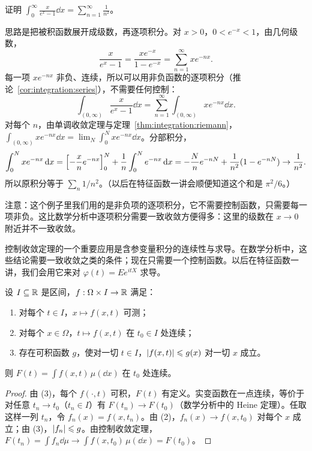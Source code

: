 \begin{workedexample}\label{we:integration:zeta2}
证明 $\displaystyle\int_0^\infty\frac x{e^x-1}\dd x=\sum_{n=1}^\infty\frac1{n^2}$。
\end{workedexample}
\begin{solution}
思路是把被积函数展开成级数，再逐项积分。对 $x>0$，$0<e^{-x}<1$，由几何级数，
\[
\frac x{e^x-1}=\frac{xe^{-x}}{1-e^{-x}}=\sum_{n=1}^\infty xe^{-nx}.
\]
每一项 $xe^{-nx}$ 非负、连续，所以可以用非负函数的逐项积分（推论~\ref{cor:integration:series}），不需要任何控制：
\[
\int_{(0,\infty)}\frac x{e^x-1}\dd x=\sum_{n=1}^\infty\int_{(0,\infty)}xe^{-nx}\dd x .
\]
对每个 $n$，由单调收敛定理与定理~\ref{thm:integration:riemann}，$\int_{(0,\infty)}xe^{-nx}\dd x=\lim_N\int_0^Nxe^{-nx}\dd x$。分部积分，
\[
\int_0^Nxe^{-nx}\,\mathrm{d} x=\Bigl[-\frac{x}{n}e^{-nx}\Bigr]_0^N+\frac1n\int_0^Ne^{-nx}\,\mathrm{d} x=-\frac Nne^{-nN}+\frac1{n^2}(1-e^{-nN})\to\frac1{n^2}.
\]
所以原积分等于 $\sum_n1/n^2$。（以后在特征函数一讲会顺便知道这个和是 $\pi^2/6$。）

注意：这个例子里我们用的是非负项的逐项积分，它不需要控制函数，只需要每一项非负。这比数学分析中逐项积分需要一致收敛方便得多：这里的级数在 $x\to0$ 附近并不一致收敛。
\end{solution}


控制收敛定理的一个重要应用是含参变量积分的连续性与求导。在数学分析中，这些结论需要一致收敛之类的条件；现在只需要一个控制函数。以后在特征函数一讲，我们会用它来对 $\varphi(t)=Ee^{itX}$ 求导。

\begin{theorem}[含参变量积分的连续性]\label{thm:integration:parameter-continuity}
设 $I\subseteq\mathbb{R}$ 是区间，$f:\Omega\times I\to\mathbb{R}$ 满足：
\begin{enumerate}
\item 对每个 $t\in I$，$x\mapsto f(x,t)$ 可测；
\item 对每个 $x\in\Omega$，$t\mapsto f(x,t)$ 在 $t_0\in I$ 处连续；
\item 存在可积函数 $g$，使对一切 $t\in I$，$\lvert f(x,t)\rvert\leqslant g(x)$ 对一切 $x$ 成立。
\end{enumerate}
则 $F(t)=\int f(x,t)\,\mu(\dd x)$ 在 $t_0$ 处连续。
\end{theorem}
\begin{proof}
由 (3)，每个 $f(\cdot,t)$ 可积，$F(t)$ 有定义。实变函数在一点连续，等价于对任意 $t_n\to t_0$（$t_n\in I$）有 $F(t_n)\to F(t_0)$（数学分析中的 Heine 定理）。任取这样一列 $t_n$，令 $f_n(x)=f(x,t_n)$。由 (2)，$f_n(x)\to f(x,t_0)$ 对每个 $x$ 成立；由 (3)，$\lvert f_n\rvert\leqslant g$。由控制收敛定理，$F(t_n)=\int f_n\dd\mu\to\int f(x,t_0)\,\mu(\dd x)=F(t_0)$。
\end{proof}

